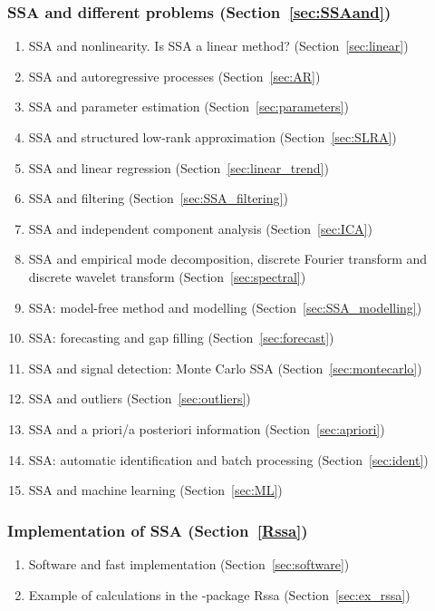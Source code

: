 \subsubsection{SSA and different problems (Section~\ref{sec:SSAand})}
\begin{enumerate}
\item SSA and nonlinearity. Is SSA a linear method? (Section~\ref{sec:linear})
\item SSA and autoregressive processes (Section~\ref{sec:AR})
\item SSA and parameter estimation (Section~\ref{sec:parameters})
\item SSA and structured low-rank approximation (Section~\ref{sec:SLRA})
\item SSA and linear regression (Section~\ref{sec:linear_trend})
\item SSA and filtering (Section~\ref{sec:SSA_filtering})
\item SSA and independent component analysis (Section~\ref{sec:ICA})
\item SSA and empirical mode decomposition, discrete Fourier transform and discrete wavelet transform (Section~\ref{sec:spectral})
\item SSA: model-free method and modelling (Section~\ref{sec:SSA_modelling})
\item SSA: forecasting and gap filling (Section~\ref{sec:forecast})
\item SSA and signal detection: Monte Carlo SSA (Section~\ref{sec:montecarlo})
\item SSA and outliers (Section~\ref{sec:outliers})
\item SSA and a priori/a posteriori information (Section~\ref{sec:apriori})
\item SSA: automatic identification and batch processing (Section~\ref{sec:ident})
\item SSA and machine learning (Section~\ref{sec:ML})
\end{enumerate}
\subsubsection{Implementation of SSA (Section~\ref{Rssa})}
\begin{enumerate}
\item Software and fast implementation (Section~\ref{sec:software})
\item Example of calculations in the \R{}-package \textsf {Rssa} (Section~\ref{sec:ex_rssa})
\end{enumerate}